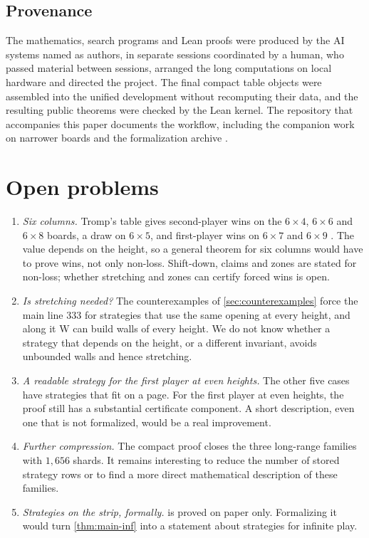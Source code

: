 \documentclass[11pt,a4paper]{article}
\theoremstyle{plain}
\theoremstyle{definition}
\newcommand{\W}{\mathrm{W}}
\begin{document}
\subsection{Provenance}

The mathematics, search programs and Lean proofs were produced by the AI systems named as authors, in separate sessions coordinated by a human, who passed material between sessions, arranged the long computations on local hardware and directed the project. The final compact table objects were assembled into the unified development without recomputing their data, and the resulting public theorems were checked by the Lean kernel. The repository that accompanies this paper documents the workflow, including the companion work on narrower boards \cite{narrow14,fourcol} and the formalization archive \cite{c4w5archive}.

\section{Open problems}
\label{sec:open}

\begin{enumerate}
  \item \emph{Six columns.} Tromp's table gives second-player wins on the $6\times4$, $6\times6$ and $6\times8$ boards, a draw on $6\times5$, and first-player wins on $6\times7$ and $6\times9$ \cite{tromp2026}. The value depends on the height, so a general theorem for six columns would have to prove wins, not only non-loss. Shift-down, claims and zones are stated for non-loss; whether stretching and zones can certify forced wins is open.
  \item \emph{Is stretching needed?} The counterexamples of \cref{sec:counterexamples} force the main line $333$ for strategies that use the same opening at every height, and along it $\W$ can build walls of every height. We do not know whether a strategy that depends on the height, or a different invariant, avoids unbounded walls and hence stretching.
  \item \emph{A readable strategy for the first player at even heights.} The other five cases have strategies that fit on a page. For the first player at even heights, the proof still has a substantial certificate component. A short description, even one that is not formalized, would be a real improvement.
  \item \emph{Further compression.} The compact proof closes the three long-range families with $1{,}656$ shards. It remains interesting to reduce the number of stored strategy rows or to find a more direct mathematical description of these families.
  \item \emph{Strategies on the strip, formally.}  is proved on paper only. Formalizing it would turn \cref{thm:main-inf} into a statement about strategies for infinite play.
\end{enumerate}
\end{document}
